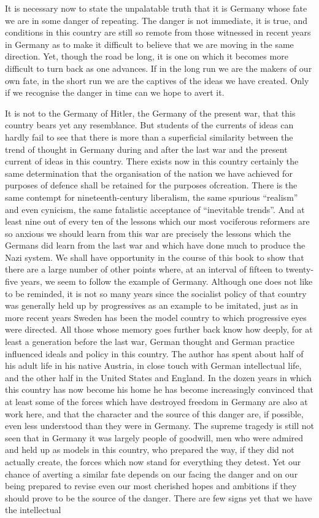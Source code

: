 \documentclass[11pt,openany]{book}
\begin{document}
It is necessary now to state the unpalatable truth that it is Germany whose fate we are in some danger of repeating. The danger is not immediate, it is true, and conditions in this country are still so remote from those witnessed in recent years in Germany as to make it difficult to believe that we are moving in the same direction. Yet, though the road be long, it is one on which it becomes more difficult to turn back as one advances. If in the long run we are the makers of our own fate, in the short run we are the captives of the ideas we have created. Only if we recognise the danger in time can we hope to avert it.

It is not to the Germany of Hitler, the Germany of the present war, that this country bears yet any resemblance. But students of the currents of ideas can hardly fail to see that there is more than a superficial similarity between the trend of thought in Germany during and after the last war and the present current of ideas in this country. There exists now in this country certainly the same determination that the organisation of the nation we have achieved for purposes of defence shall be retained for the purposes ofcreation. There is the same contempt for nineteenth-century liberalism, the same spurious ``realism'' and even cynicism, the same fatalistic acceptance of ``inevitable trends''. And at least nine out of every ten of the lessons which our most vociferous reformers are so anxious we should learn from this war are precisely the lessons which the Germans did learn from the last war and which have done much to produce the Nazi system. We shall have opportunity in the course of this book to show that there are a large number of other points where, at an interval of fifteen to twenty-five years, we seem to follow the example of Germany. Although one does not like to be reminded, it is not so many years since the socialist policy of that country was generally held up by progressives as an example to be imitated, just as in more recent years Sweden has been the model country to which progressive eyes were directed. All those whose memory goes further back know how deeply, for at least a generation before the last war, German thought and German practice influenced ideals and policy in this country. The author has spent about half of his adult life in his native Austria, in close touch with German intellectual life, and the other half in the United States and England. In the dozen years in which this country has now become his home he has become increasingly convinced that at least some of the forces which have destroyed freedom in Germany are also at work here, and that the character and the source of this danger are, if possible, even less understood than they were in Germany. The supreme tragedy is still not seen that in Germany it was largely people of goodwill, men who were admired and held up as models in this country, who prepared the way, if they did not actually create, the forces which now stand for everything they detest. Yet our chance of averting a similar fate depends on our facing the danger and on our being prepared to revise even our most cherished hopes and ambitions if they should prove to be the source of the danger. There are few signs yet that we have the intellectual 
\end{document}
